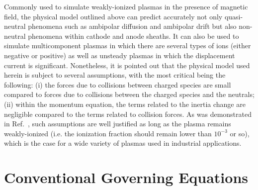 \documentclass{warpdoc}
\begin{document}
Commonly used to simulate weakly-ionized plasmas in the presence of magnetic field, the physical model outlined above can predict accurately not only quasi-neutral phenomena such as ambipolar diffusion and ambipolar drift but also non-neutral phenomena within cathode and anode sheaths. It can also be used to simulate multicomponent plasmas in which there are several types of ions (either negative or positive) as well as unsteady plasmas in which the displacement current is significant. Nonetheless, it is pointed out that the physical model used herein is subject to several assumptions, with the most critical being the following: (i) the forces due to collisions between charged species are small compared to forces due to collisions  between the charged species and the neutrals; (ii) within the momentum equation, the terms related to the inertia change are negligible compared to the terms related to collision forces. As was demonstrated in Ref.\ \cite{jcp:2011:parent}, such assumptions are well justified as long as the plasma remains weakly-ionized (i.e. the ionization fraction should remain lower than $10^{-3}$ or so), which is the case for a wide variety of plasmas used in industrial applications.     



\section{Conventional Governing Equations}
\end{document}
